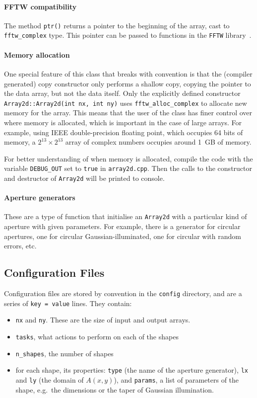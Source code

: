 \documentclass[11pt]{article}
\begin{document}
\paragraph{FFTW compatibility} The method \texttt{ptr()} returns a pointer to the beginning of the array, cast to \texttt{fftw\_complex} type. This pointer can be passed to functions in the \texttt{FFTW} library~\cite[Section 4]{fftw}.

\paragraph{Memory allocation} One special feature of this class that breaks with convention is that the (compiler generated) copy constructor only performs a shallow copy, copying the pointer to the data array, but not the data itself. Only the explicitly defined constructor \texttt{Array2d::Array2d(int nx, int ny)} uses \texttt{fftw\_alloc\_complex} to allocate new memory for the array. This means that the user of the class has finer control over where memory is allocated, which is important in the case of large arrays. For example, using IEEE double-precision floating point, which occupies 64 bits of memory, a $2^{13} \times 2^{13}$ array of complex numbers occupies around \SI{1}{GB} of memory.

For better understanding of when memory is allocated, compile the code with the variable \texttt{DEBUG\_OUT} set to \texttt{true} in \texttt{array2d.cpp}. Then the calls to the constructor and destructor of \texttt{Array2d} will be printed to console.

\paragraph{Aperture generators} These are a type of function that initialise an \texttt{Array2d} with a particular kind of aperture with given parameters. For example, there is a generator for circular apertures, one for circular Gaussian-illuminated, one for circular with random errors, etc.

\subsection{Configuration Files}
Configuration files are stored by convention in the \texttt{config} directory, and are a series of \texttt{key = value} lines. They contain:
\begin{itemize}
    \item \texttt{nx} and \texttt{ny}. These are the size of input and output arrays.
    \item \texttt{tasks}, what actions to perform on each of the shapes
    \item \texttt{n\_shapes}, the number of shapes
    \item for each shape, its properties: \texttt{type} (the name of the aperture generator), \texttt{lx} and \texttt{ly} (the domain of $A(x,y)$), and \texttt{params}, a list of parameters of the shape, e.g.\ the dimensions or the taper of Gaussian illumination.
\end{itemize}
\end{document}
